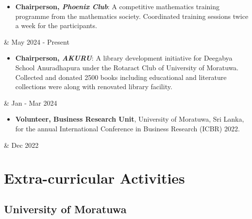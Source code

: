 \documentclass[10pt, a4paper]{article}
\newenvironment{highlights}{
        \begin{itemize}[
                topsep=0pt,
                parsep=0.10 cm,
                partopsep=0pt,
                itemsep=0pt,
                after=\vspace{-1\baselineskip},
                leftmargin=0.4 cm + 3pt
            ]
    }{
        \end{itemize}
    } %
\let\originalTabularx\tabularx
\let\originalEndTabularx\endtabularx
\renewenvironment{tabularx}{\bgroup\centering\originalTabularx}{\originalEndTabularx\par\egroup}
\begin{document}
	\begin{tabularx}{
            \textwidth-0.4 cm-0.13cm
        }{
            K{0.2 cm}
            R{4.1 cm}
        }
            \begin{highlights}
			\item \textbf{Chairperson, \textit{Phoenix Club}}: A competitive mathematics training programme from the mathematics society. Coordinated training sessions twice a week for the participants. \end{highlights}
            &
            May 2024 - Present
	\end{tabularx}
	
	\begin{tabularx}{
            \textwidth-0.4 cm-0.13cm
        }{
            K{0.2 cm}
            R{4.1 cm}
        }
            \begin{highlights}
			\item \textbf{Chairperson, \textit{AKURU}}: A library development initiative for Deegabya School Anuradhapura under the Rotaract Club of University of Moratuwa. Collected and donated 2500 books including educational and literature collections were  along with renovated library facility. \end{highlights}
            &
            Jan - Mar 2024
        \end{tabularx}

	\begin{tabularx}{
            \textwidth-0.4 cm-0.13cm
        }{
            K{0.2 cm}
            R{4.1 cm}
        }
            \begin{highlights}
			\item \textbf{Volunteer, Business Research Unit}, University of Moratuwa, Sri Lanka, for the annual International Conference in Business Research (ICBR) 2022. \end{highlights}
            &
            Dec 2022
        \end{tabularx}

     \section{Extra-curricular Activities}
	\subsection{University of Moratuwa}
	
\end{document}
